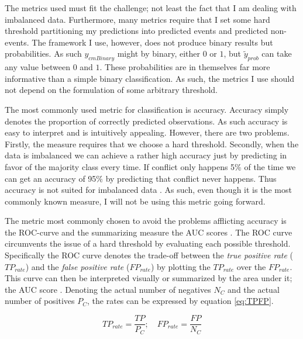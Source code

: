 \documentclass[a4paper]{article}
\begin{document}
The metrics used must fit the challenge; not least the fact that I am dealing with imbalanced data. Furthermore, many metrics require that I set some hard threshold partitioning my predictions into predicted events and predicted non-events. The framework I use, however, does not produce binary results but probabilities. As such $y_{cmBinary}$ might by binary, either $0$ or $1$, but $\tilde{y}_{prob}$ can take any value between $0$ and $1$. These probabilities are in themselves far more informative than a simple binary classification. As such, the metrics I use should not depend on the formulation of some arbitrary threshold.\par 

The most commonly used metric for classification is accuracy. Accuracy simply denotes the proportion of correctly predicted observations. As such accuracy is easy to interpret and is intuitively appealing. However, there are two problems. Firstly, the measure requires that we choose a hard threshold. Secondly, when the data is imbalanced we can achieve a rather high accuracy just by predicting in favor of the majority class every time. If conflict only happens 5\% of the time we can get an accuracy of 95\% by predicting that conflict never happens. Thus accuracy is not suited for imbalanced data \citep[1264]{He_2008}. As such, even though it is the most commonly known measure, I will not be using this metric going forward.\par

The metric most commonly chosen to avoid the problems afflicting accuracy is the ROC-curve and the summarizing measure the AUC scores \citep[1277-1278]{He_2008}. The ROC curve circumvents the issue of a hard threshold by evaluating each possible threshold. Specifically the ROC curve denotes the trade-off between the \emph{true positive rate} ($TP_{rate}$) and the \emph{false positive rate} ($FP_{rate}$) by plotting the $TP_{rate}$ over the $FP_{rate}$. This curve can then be interpreted visually or summarized by the area under it; the AUC score \citep[1277-1278]{He_2008}. Denoting the actual number of negatives $N_C$ and the actual number of positives $P_C$, the rates can be expressed by equation \ref{eq:TPFP}.\par

\[
TP_{rate} = \frac{TP}{P_C};\quad FP_{rate}=\frac{FP}{N_C} \tag{15} \label{eq:TPFP}
\]
\end{document}
